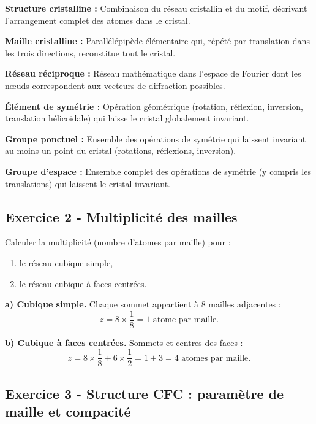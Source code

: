 \documentclass[12pt,a4paper]{article}
\begin{document}
\begin{boitecorrige}
\textbf{Structure cristalline :} Combinaison du réseau cristallin et du motif, décrivant l'arrangement complet des atomes dans le cristal.

\textbf{Maille cristalline :} Parallélépipède élémentaire qui, répété par translation dans les trois directions, reconstitue tout le cristal.

\textbf{Réseau réciproque :} Réseau mathématique dans l'espace de Fourier dont les n\oe{}uds correspondent aux vecteurs de diffraction possibles.

\textbf{Élément de symétrie :} Opération géométrique (rotation, réflexion, inversion, translation hélicoïdale) qui laisse le cristal globalement invariant.

\textbf{Groupe ponctuel :} Ensemble des opérations de symétrie qui laissent invariant au moins un point du cristal (rotations, réflexions, inversion).

\textbf{Groupe d'espace :} Ensemble complet des opérations de symétrie (y compris les translations) qui laissent le cristal invariant.

\end{boitecorrige}

\subsection*{Exercice 2 - Multiplicité des mailles \niveau{\facile}}

\begin{boiteexercice}
\niveau{\facile}
Calculer la multiplicité (nombre d'atomes par maille) pour :
\begin{enumerate}[label=\alph*)]
  \item le réseau cubique simple,
  \item le réseau cubique à faces centrées.
\end{enumerate}
\end{boiteexercice}

\begin{boitecorrige}
\textbf{a) Cubique simple.} Chaque sommet appartient à 8 mailles adjacentes :
\[
z = 8 \times \frac{1}{8} = 1 \text{ atome par maille.}
\]

\textbf{b) Cubique à faces centrées.} Sommets et centres des faces :
\[
z = 8 \times \frac{1}{8} + 6 \times \frac{1}{2} = 1 + 3 = 4 \text{ atomes par maille.}
\]
\end{boitecorrige}

\subsection*{Exercice 3 - Structure CFC : paramètre de maille et compacité \niveau{\moyen}}
\end{document}
